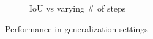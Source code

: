 \begin{figure}[h!]
\begin{subfigure}{0.5\hsize}
    \caption{\footnotesize{IoU vs varying \# of steps}}
    \label{fig:large_steps}
\end{subfigure}
\caption{\footnotesize{Performance in generalization settings}}
\end{figure}



